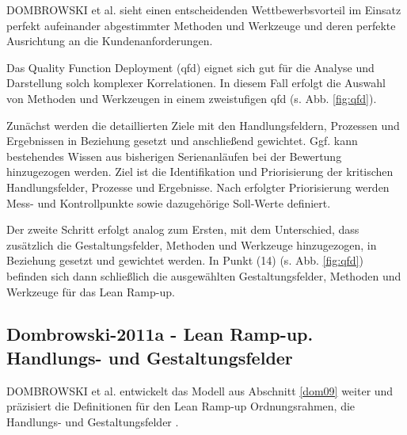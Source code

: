 DOMBROWSKI et al. sieht einen entscheidenden Wettbewerbsvorteil im Einsatz perfekt aufeinander abgestimmter Methoden und Werkzeuge und deren perfekte Ausrichtung an die Kundenanforderungen. 

Das Quality Function Deployment (\gls{qfd}) eignet sich gut für die Analyse und Darstellung solch komplexer Korrelationen. In diesem Fall erfolgt die Auswahl von Methoden und Werkzeugen in einem zweistufigen \gls{qfd} (s. Abb. \ref{fig:qfd}). 

Zunächst werden die detaillierten Ziele mit den Handlungsfeldern, Prozessen und Ergebnissen in Beziehung gesetzt und anschließend gewichtet. Ggf. kann bestehendes Wissen aus bisherigen Serienanläufen bei der Bewertung hinzugezogen werden. 
Ziel ist die Identifikation und Priorisierung der kritischen Handlungsfelder, Prozesse und Ergebnisse.
Nach erfolgter Priorisierung werden Mess- und Kontrollpunkte sowie dazugehörige Soll-Werte definiert. 

Der zweite Schritt erfolgt analog zum Ersten, mit dem Unterschied, dass zusätzlich die Gestaltungsfelder, Methoden und Werkzeuge hinzugezogen, in Beziehung gesetzt und gewichtet werden. 
In Punkt (14) (s. Abb. \ref{fig:qfd}) befinden sich dann schließlich die ausgewählten Gestaltungsfelder, Methoden und Werkzeuge für das Lean Ramp-up. 


\subsection*{Dombrowski-2011a - Lean Ramp-up. Handlungs- und Gestaltungsfelder}\label{sec:dom11a}

DOMBROWSKI et al. entwickelt das Modell aus Abschnitt \ref{dom09} %
weiter und präzisiert die Definitionen für den Lean Ramp-up Ordnungsrahmen, die Handlungs- und Gestaltungsfelder \autocite{Dombrowski2011a}. 

